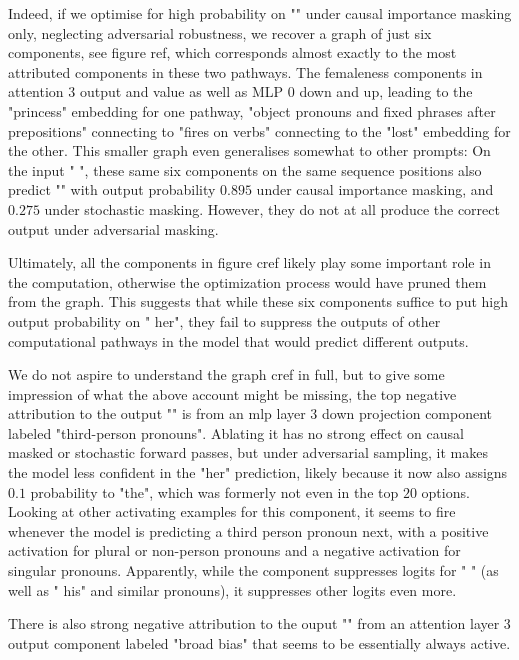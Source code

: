 \documentclass{article}
\begin{document}
Indeed, if we optimise for high probability on "" under causal importance masking only, neglecting adversarial robustness, we recover a graph of just six components, see figure ref, which corresponds almost exactly to the most attributed components in these two pathways. The femaleness components in attention 3 output and value as well as MLP 0 down and up, leading to the "princess" embedding for one pathway, "object pronouns and fixed phrases after prepositions" connecting to "fires on verbs" connecting to the "lost" embedding for the other. This smaller graph even generalises somewhat to other prompts: On the input "     ", these same six components on the same sequence positions also predict "" with output probability $0.895$ under causal importance masking, and $0.275$ under stochastic masking. However, they do not at all produce the correct output under adversarial masking. 

Ultimately, all the components in figure cref likely play some important role in the computation, otherwise the optimization process would have pruned them from the graph. This suggests that while these six components suffice to put high output probability on " her", they fail to suppress the outputs of other computational pathways in the model that would predict different outputs. 

We do not aspire to understand the graph cref in full, but to give some impression of what the above account might be missing, the top negative attribution to the output "" is from an mlp layer 3 down projection component labeled "third-person pronouns". Ablating it has no strong effect on causal masked or stochastic forward passes, but under adversarial sampling, it makes the model less confident in the "her" prediction, likely because it now also assigns $0.1$ probability to "the", which was formerly not even in the top $20$ options. Looking at other activating examples for this component, it seems to fire whenever the model is predicting a third person pronoun next, with a positive activation for plural or non-person pronouns and a negative activation for singular pronouns. Apparently, while the component suppresses logits for " " (as well as " his" and similar pronouns), it suppresses other logits even more. 

There is also strong negative attribution to the ouput "" from an attention layer 3 output component labeled "broad bias" that seems to be essentially always active.
\end{document}
